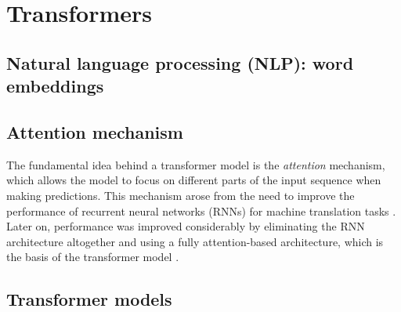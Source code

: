 \section{Transformers}\label{sec:transformers}

\subsection{Natural language processing (NLP): word embeddings}\label{subsec:nlp_word_embeddings}


\subsection{Attention mechanism}\label{subsec:attention_mechanism}

The fundamental idea behind a transformer model is the \emph{attention} mechanism, which allows the model to focus on different parts of the input sequence when making predictions. This mechanism arose from the need to improve the performance of recurrent neural networks (RNNs) for machine translation tasks \cite{bahdanauNeuralMachineTranslation2016}. Later on, performance was improved considerably by eliminating the RNN architecture altogether and using a fully attention-based architecture, which is the basis of the transformer model \cite{vaswaniAttentionAllYou2017}. 





\subsection{Transformer models}\label{subsec:transformer_models}